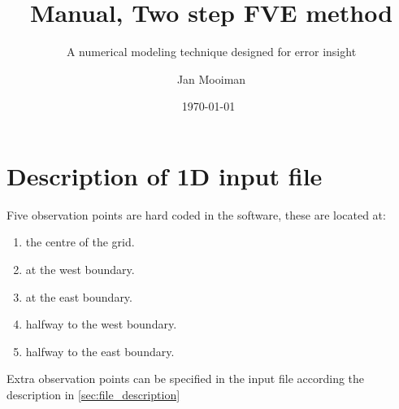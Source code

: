 \documentclass[subfooter, backcover]{mooiman_memo}
\begin{document}
\title{Manual, Two step FVE method}
\subtitle{A numerical modeling technique designed for error insight}
\author{Jan Mooiman}
\partner{}

\date{\today~\currenttime} %

\memoTo{}

\mooimantitle
\chapter{Description of 1D input file}
Five observation points are hard coded in the software, these are located at:
\begin{enumerate}
    \item the centre of the grid.
    \item at the west boundary.
    \item at the east boundary.
    \item halfway to the west boundary.
    \item halfway to the east boundary.
\end{enumerate}
Extra observation points can be specified in the input file according the description in \autoref{sec:file_description}
\end{document}
